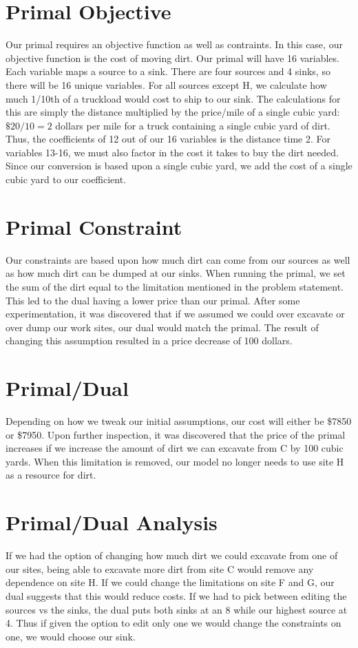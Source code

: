 \documentclass[12pt]{article} %
\begin{document}
\section*{Primal Objective}
Our primal requires an objective function as well as contraints. In this case, our objective function is the cost of moving dirt. Our primal will have 16 variables. Each variable maps a source to a sink. There are four sources and 4 sinks, so there will be 16 unique variables. For all sources except H, we calculate how much 1/10th of a truckload would cost to ship to our sink. The calculations for this are simply the distance multiplied by the price/mile of a single cubic yard: $\$20/10 = 2$ dollars per mile for a truck containing a single cubic yard of dirt. Thus, the coefficients of 12 out of our 16 variables is the distance time 2. For variables 13-16, we must also factor in the cost it takes to buy the dirt needed. Since our conversion is based upon a single cubic yard, we add the cost of a single cubic yard to our coefficient.

\section*{Primal Constraint}
Our constraints are based upon how much dirt can come from our sources as well as how much dirt can be dumped at our sinks. When running the primal, we set the sum of the dirt equal to the limitation mentioned in the problem statement. This led to the dual having a lower price than our primal. After some experimentation, it was discovered that if we assumed we could over excavate or over dump our work sites, our dual would match the primal. The result of changing this assumption resulted in a price decrease of 100 dollars.

\section*{Primal/Dual}
Depending on how we tweak our initial assumptions, our cost will either be \$7850 or \$7950. Upon further inspection, it was discovered that the price of the primal increases if we increase the amount of dirt we can excavate from C by 100 cubic yards. When this limitation is removed, our model no longer needs to use site H as a resource for dirt.

\section*{Primal/Dual Analysis}
If we had the option of changing how much dirt we could excavate from one of our sites, being able to excavate more dirt from site C would remove any dependence on site H. If we could change the limitations on site F and G, our dual suggests that this would reduce costs. If we had to pick between editing the sources vs the sinks, the dual puts both sinks at an 8 while our highest source at 4. Thus if given the option to edit only one we would change the constraints on one, we would choose our sink.
\end{document}
